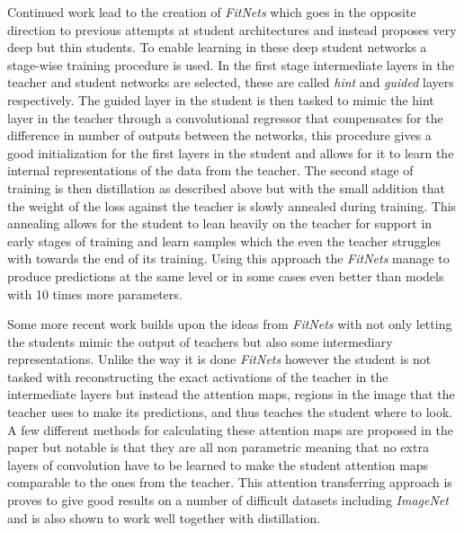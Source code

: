 \documentclass{kththesis}
\newcommand{\bibentry}[1]{\parencite{#1}}
\begin{document}
Continued work lead to the creation of \emph{FitNets}
\bibentry{romero2014fitnets} which goes in the opposite direction to previous
attempts at student architectures and instead proposes very deep but thin
students. To enable learning in these deep student networks a stage-wise
training procedure is used. In the first stage intermediate layers in the
teacher and student networks are selected, these are called \emph{hint} and
\emph{guided} layers respectively. The guided layer in the student is then
tasked to mimic the hint layer in the teacher through a convolutional regressor
that compensates for the difference in number of outputs between the networks,
this procedure gives a good initialization for the first layers in the student
and allows for it to learn the internal representations of the data from the
teacher. The second stage of training is then distillation as described above
but with the small addition that the weight of the loss against the teacher is
slowly annealed during training. This annealing allows for the student to lean
heavily on the teacher for support in early stages of training and learn samples
which the even the teacher struggles with towards the end of its training. Using
this approach the \emph{FitNets} manage to produce predictions at the same level
or in some cases even better than models with 10 times more parameters. 

Some more recent work \bibentry{zagouruyko2017paying} builds upon the ideas from
\emph{FitNets} with not only letting the students mimic the output of teachers
but also some intermediary representations. Unlike the way it is done
\emph{FitNets} however the student is not tasked with reconstructing the exact
activations of the teacher in the intermediate layers but instead the attention
maps, regions in the image that the teacher uses to make its predictions, and
thus teaches the student where to look. A few different methods for calculating
these attention maps are proposed in the paper but notable is that they are all
non parametric meaning that no extra layers of convolution have to be learned to
make the student attention maps comparable to the ones from the teacher. This
attention transferring approach is proves to give good results on a number of
difficult datasets including \emph{ImageNet} and is also shown to work well
together with distillation. 
\end{document}
